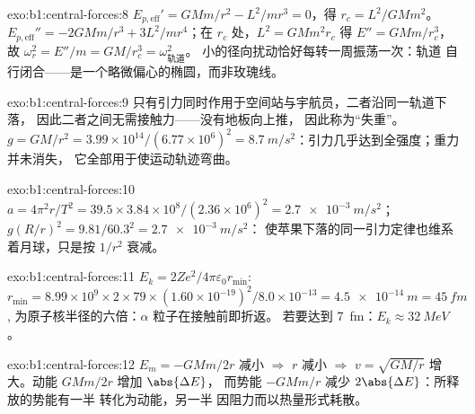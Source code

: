 \begin{solution}{exo:b1:central-forces:8}
$E_{p,\mathrm{eff}}' = GMm/r^2 - L^2/mr^3 = 0$，得 $r_c = L^2/GMm^2$。
$E_{p,\mathrm{eff}}'' = -2GMm/r^3 + 3L^2/mr^4$；在 $r_c$ 处，$L^2 = GMm^2r_c$
得 $E'' = GMm/r_c^3$，故 $\omega_r^2 = E''/m = GM/r_c^3 = \omega_{\text{轨道}}^2$。
小的径向扰动恰好每转一周振荡一次：轨道
自行闭合——是一个略微偏心的椭圆，而非玫瑰线。
\end{solution}

\begin{solution}{exo:b1:central-forces:9}
只有引力同时作用于空间站与宇航员，二者沿同一轨道下落，
因此二者之间无需接触力——没有地板向上推，
因此称为“失重”。$g = GM/r^2 = 3.99\times10^{14}/(6.77\times10^6)^2
= \qty{8.7}{m/s^2}$：引力几乎达到全强度；重力并未消失，
它全部用于使运动轨迹弯曲。
\end{solution}

\begin{solution}{exo:b1:central-forces:10}
$a = 4\pi^2r/T^2 = 39.5 \times 3.84\times10^8/(2.36\times10^6)^2 =
\qty{2.7e-3}{m/s^2}$；$g(R/r)^2 = 9.81/60.3^2 = \qty{2.7e-3}{m/s^2}$：
使苹果下落的同一引力定律也维系着月球，只是按 $1/r^2$ 衰减。
\end{solution}

\begin{solution}{exo:b1:central-forces:11}
$E_k = 2Ze^2/4\pi\varepsilon_0r_{\min}$: $r_{\min} = 8.99\times10^9 \times 2 \times 79
\times (1.60\times10^{-19})^2/8.0\times10^{-13} = \qty{4.5e-14}{m} = \qty{45}{fm}$,
为原子核半径的六倍：$\alpha$ 粒子在接触前即折返。
若要达到 \qty{7}{fm}：$E_k \approx \qty{32}{MeV}$。
\end{solution}

\begin{solution}{exo:b1:central-forces:12}
$E_m = -GMm/2r$ 减小 $\Rightarrow$ $r$ 减小 $\Rightarrow$ $v =
\sqrt{GM/r}$ 增大。动能 $GMm/2r$ 增加 $\abs{\Delta E}$，
而势能 $-GMm/r$ 减少 $2\abs{\Delta E}$：所释放的势能有一半
转化为动能，另一半
因阻力而以热量形式耗散。
\end{solution}

